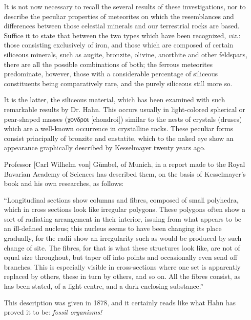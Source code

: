 \documentclass[a4paper, 12pt, oneside]{article}
\begin{document}
It is not now necessary to recall the several results of these investigations, nor to describe the peculiar properties of meteorites on which the resemblances and differences between those celestial minerals and our terrestrial rocks are based. Suffice it to state that between the two types which have been recognized, \emph{viz.}: those consisting exclusively of iron, and those which are composed of certain siliceous minerals, such as augite, bronzite, olivine, anorthite and other feldspars, there are all the possible combinations of both; the ferrous meteorites predominate, however, those with a considerable percentage of siliceous constituents being comparatively rare, and the purely siliceous still more so.

It is the latter, the siliceous material, which has been examined with such remarkable results by Dr. Hahn. This occurs usually in light-colored spherical or pear-shaped masses (χονδροι [chondroi]) similar to the nests of crystals (druses) which are a well-known occurrence in crystalline rocks. These peculiar forms consist principally of bronzite and enstatite, which to the naked eye show an appearance graphically described by Kesselmayer twenty years ago.

Professor [Carl Wilhelm von] Gümbel, of Munich, in a report made to the Royal Bavarian Academy of Sciences has described them, on the basis of Kesselmayer's book and his own researches, as follows:

``Longitudinal sections show columns and fibres, composed of small polyhedra, which in cross sections look like irregular polygons. These polygons often show a sort of radiating arrangement in their interior, issuing from what appears to be an ill-defined nucleus; this nucleus seems to have been changing its place gradually, for the radii show an irregularity such as would be produced by such change of site. The fibres, for that is what these structures look like, are not of equal size throughout, but taper off into points and occasionally even send off branches. This is especially visible in cross-sections where one set is apparently replaced by others, these in turn by others, and so on. All the fibres consist, as has been stated, of a light centre, and a dark enclosing substance.''

This description was given in 1878, and it certainly reads like what Hahn has proved it to be: \emph{fossil organisms!}
\end{document}
